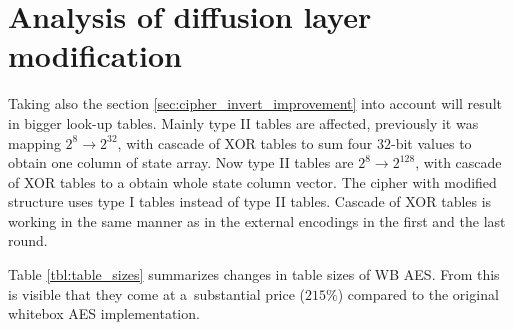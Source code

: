 \documentclass[11pt,oneside,final]{fithesis2}
\begin{document}
    \section{Analysis of diffusion layer modification}
    Taking also the section \ref{sec:cipher_invert_improvement} into account will result in bigger look-up tables. Mainly type II tables are affected, previously 
    it was mapping $2^8 \rightarrow 2^{32}$, with cascade of XOR tables to sum four $32$-bit values to obtain one column of state array. Now type II tables are
    $2^8 \rightarrow 2^{128}$, with cascade of XOR tables to a obtain whole state column vector. The cipher with modified structure uses type I tables instead of type II tables.
    Cascade of XOR tables is working in the same manner as in the external encodings in the first and the last round.

    Table \ref{tbl:table_sizes} summarizes changes in table sizes of WB AES. From this is visible that
    they come at a~substantial price ($215\%$) compared to the original whitebox AES implementation.
    
\end{document}
